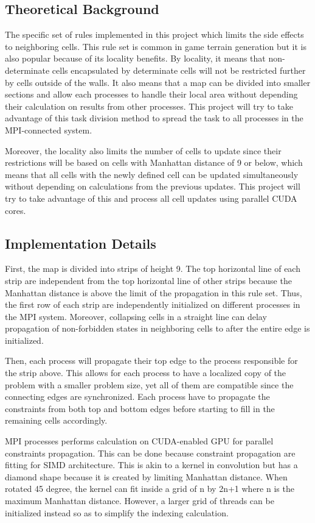 \subsection{Theoretical Background}
The specific set of rules implemented in this project which limits the side effects to neighboring cells. This rule set is common in game terrain generation but it is also popular because of its locality benefits. 
By locality, it means that non-determinate cells encapsulated by determinate cells will not be restricted further by cells outside of the walls. 
It also means that a map can be divided into smaller sections and allow each processes to handle their local area without depending their calculation on results from other processes. This project will try to take advantage of this task division method to spread the task to all processes in the MPI-connected system.

Moreover, the locality also limits the number of cells to update since their restrictions will be based on cells with Manhattan distance of 9 or below, which means that all cells with the newly defined cell can be updated simultaneously without depending on calculations from the previous updates. This project will try to take advantage of this and process all cell updates using parallel CUDA cores.


\subsection{Implementation Details}

First, the map is divided into strips of height 9. The top horizontal line of each strip are independent from the top horizontal line of other strips because the Manhattan distance is above the limit of the propagation in this rule set.
Thus, the first row of each strip are independently initialized on different processes in the MPI system. Moreover, collapsing cells in a straight line can delay propagation of non-forbidden states in neighboring cells to after the entire edge is initialized.

Then, each process will propagate their top edge to the process responsible for the strip above. This allows for each process to have a localized copy of the problem with a smaller problem size, yet all of them are compatible since the connecting edges are synchronized. Each process have to propagate the constraints from both top and bottom edges before starting to fill in the remaining cells accordingly. 

MPI processes performs calculation on CUDA-enabled GPU for parallel constraints propagation. This can be done because constraint propagation are fitting for SIMD architecture. This is akin to a kernel in convolution but has a diamond shape because it is created by limiting Manhattan distance. When rotated 45 degree, the kernel can fit inside a grid of n by 2n+1 where n is the maximum Manhattan distance. However, a larger grid of threads can be initialized instead so as to simplify the indexing calculation. 

